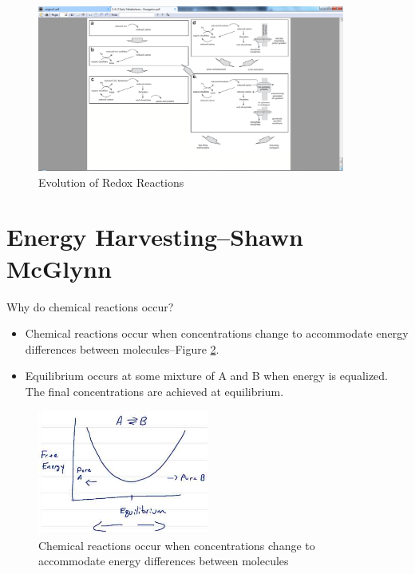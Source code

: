 \documentclass[]{article}
\begin{document}
\begin{figure}[H]
	\caption{Evolution of Redox Reactions} \label{fig:PrimordialRedox2} 
	\includegraphics[width=0.9\textwidth]{PrimordialRedox2}
\end{figure}

\section[Energy Harvesting]{Energy Harvesting--Shawn McGlynn}

Why do chemical reactions occur?

\begin{itemize}
	\item Chemical reactions occur when concentrations change to accommodate energy differences between molecules--Figure \ref{fig:EnergyHarvest}.
	
	\item Equilibrium occurs at some mixture of A and B when energy is equalized. The final concentrations are achieved at equilibrium.
	
\end{itemize}

\begin{figure}[H]
	\begin{center}
		\caption[What energy is being harvested?]{Chemical reactions occur when concentrations change to accommodate energy differences between molecules}\label{fig:EnergyHarvest}
		\includegraphics[width=0.5\textwidth]{EnergyHarvest}
	\end{center}
\end{figure}
\end{document}
